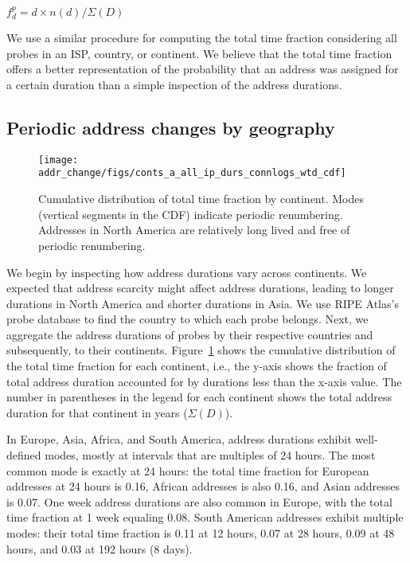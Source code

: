 $f^p_d =  d \times n(d) / \Sigma(D)$

We use a similar procedure for computing the total time fraction
considering all probes in an ISP, country, or continent. We believe that  
the total time fraction offers a better representation of 
the probability that an address was assigned for a certain
duration than a simple inspection of the address durations. 

\subsection{Periodic address changes by geography}
\label{sec:periodic-geography}

\begin{figure}[tb]
  \begin{center}
    \texttt{[image: addr\_change/figs/conts\_a\_all\_ip\_durs\_connlogs\_wtd\_cdf]}
  \end{center}
  \caption{\label{fig:conts_all_durs} 
    Cumulative distribution of total time fraction by continent. 
    Modes (vertical segments
    in the CDF) indicate periodic renumbering.  Addresses in North America
    are relatively long lived and free of periodic renumbering.}
\end{figure}

We begin by inspecting how address durations vary across continents.
We expected that address scarcity might affect address durations,
leading to longer durations in North America and shorter durations in
Asia.  We use RIPE Atlas's probe database to find the country to which
each probe belongs. Next, we aggregate the address durations of probes
by their respective countries and subsequently, to their continents.
Figure~\ref{fig:conts_all_durs} shows the cumulative distribution of
the total time fraction for each continent, i.e., the y-axis shows the
fraction of total address duration accounted for by durations less
than the x-axis value.
The number in
parentheses in the legend for each continent shows the total
 address duration for that continent in years ($\Sigma(D)$).

In Europe, Asia, Africa, and South America, address durations exhibit
well-defined modes, mostly at intervals that are multiples of 24
hours. The most common mode is exactly at 24 hours: the total time
fraction for European addresses at 24 hours is 0.16, African addresses
is also 0.16, and Asian addresses is 0.07.  One week address durations
are also common in Europe, with the total time fraction at 1 week
equaling 0.08.  South American addresses exhibit multiple modes: their
total time fraction is 0.11 at 12 hours, 0.07 at 28 hours, 0.09 at 48
hours, and 0.03 at 192 hours (8 days).

